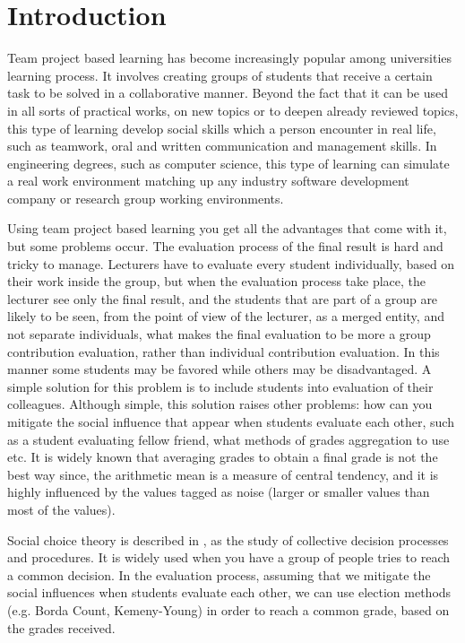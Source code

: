 \chapter*{Introduction}
Team project based learning has become increasingly popular among universities learning process. It involves creating groups of students that receive a certain task to be solved in a collaborative manner. Beyond the fact that it can be used in all sorts of practical works, on new topics or to deepen already reviewed topics, this type of learning develop social skills which a person encounter in real life, such as teamwork, oral and written communication \cite{peev} and management skills. In engineering degrees, such as computer science, this type of learning can simulate a real work environment matching up any industry software development company or research group working environments.

Using team project based learning you get all the advantages that come with it, but some problems occur. The evaluation process of the final result is hard and tricky to manage. Lecturers have to evaluate every student individually, based on their work inside the group, but when the evaluation process take place, the lecturer see only the final result, and the students that are part of a group are likely to be seen, from the point of view of the lecturer, as a merged entity, and not separate individuals, what makes the final evaluation to be more a group contribution evaluation, rather than individual contribution evaluation. In this manner some students may be favored while others may be disadvantaged. A simple solution for this problem is to include students into evaluation of their colleagues. Although simple, this solution raises other problems: how can you mitigate the social influence that appear when students evaluate each other, such as a student evaluating fellow friend, what methods of grades aggregation to use etc. It is widely known that averaging grades to obtain a final grade is not the best way since, the arithmetic mean is a measure of central tendency, and it is highly influenced by the values tagged as noise (larger or smaller values than most of the values).

Social choice theory is described in \cite{scdef}, as the study of collective decision processes and procedures. It is widely used when you have a group of people tries to reach a common decision. In the evaluation process, assuming that we mitigate the social influences when students evaluate each other, we can use election methods (e.g. Borda Count, Kemeny-Young) in order to reach a common grade, based on the grades received.

